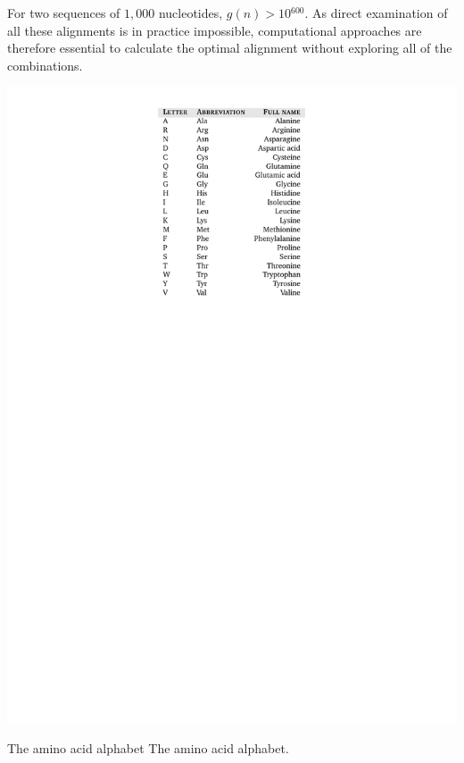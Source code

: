 \begin{center}
\end{center}

For two sequences of $1,000$ nucleotides, $g(n) > 10{^{600}}$. As direct examination of all these 
alignments is in practice impossible, computational approaches are therefore essential to calculate 
the optimal alignment without exploring all of the combinations.

\begin{table}[t!]
\begin{center}
\begin{minipage}{0.4\linewidth}\setlength{\parindent}{0pt}
\includegraphics[bb=200 564 397 817,clip]{tables/code2}
\end{minipage}
          {The amino acid alphabet}%
          {The amino acid alphabet.}%
          {}
\end{center}
\end{table}

